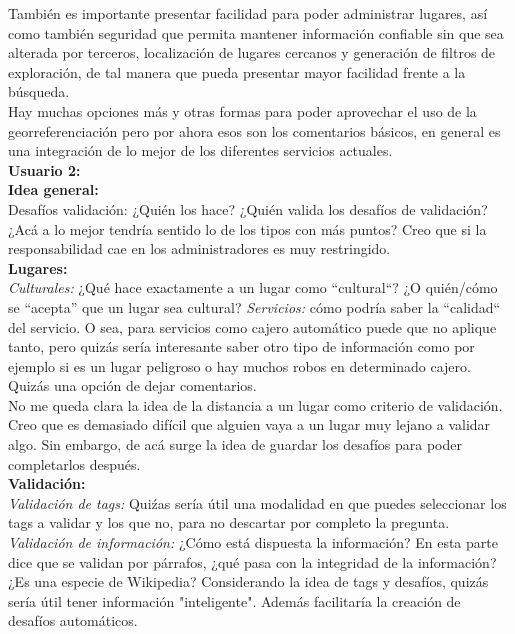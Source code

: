\documentclass[10pt,letterpaper]{article}
\begin{document}
También es importante presentar facilidad para poder administrar lugares, así como también seguridad que permita mantener información confiable sin que sea alterada por terceros, localización de lugares cercanos y generación de filtros de exploración, de tal manera que pueda presentar mayor facilidad frente a la búsqueda.\\

Hay muchas opciones más y otras formas para poder aprovechar el uso de la georreferenciación pero por ahora esos son los comentarios básicos, en general es una integración de lo mejor de los diferentes servicios actuales.\\

\textbf{Usuario 2:}\\

\textbf{Idea general:}\\

Desafíos validación: ¿Quién los hace? ¿Quién valida los desafíos de validación? ¿Acá a lo mejor tendría sentido lo de los tipos con más puntos? Creo que si la responsabilidad cae en los administradores es muy restringido.\\

\textbf{Lugares:}\\

\textsl{Culturales:} ¿Qué hace exactamente a un lugar como ``cultural``? ¿O quién/cómo se ``acepta'' que un lugar sea cultural?
\textsl{Servicios:} cómo podría saber la ``calidad`` del servicio. O sea, para servicios como cajero automático puede que no aplique tanto, pero quizás sería interesante saber otro tipo de información como por ejemplo si es un lugar peligroso o hay muchos robos en determinado cajero. Quizás una opción de dejar comentarios.\\

No me queda clara la idea de la distancia a un lugar como criterio de validación. Creo que es demasiado difícil que alguien vaya a un lugar muy lejano a validar algo. Sin embargo, de acá surge la idea de guardar los desafíos para poder completarlos después.\\

\textbf{Validación:}\\

\textsl{Validación de tags:} Quiźas sería útil una modalidad en que puedes seleccionar los tags a validar y los que no, para no descartar por completo la pregunta.\\

\textsl{Validación de información:} ¿Cómo está dispuesta la información? En esta parte dice que se validan por párrafos, ¿qué pasa con la integridad de la información? ¿Es una especie de Wikipedia? Considerando la idea de tags y desafíos, quizás sería útil tener información "inteligente". Además facilitaría la creación de desafíos automáticos.\\
\end{document}
